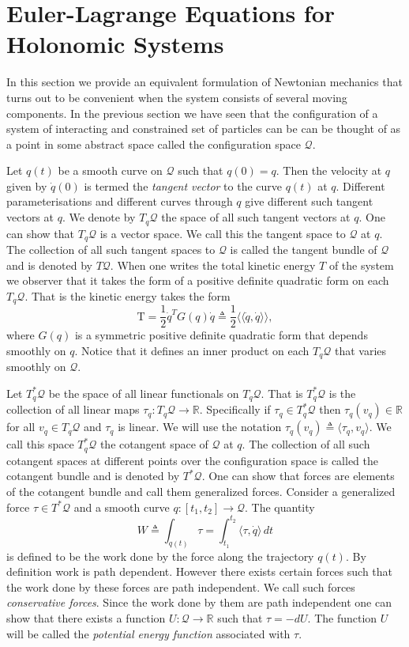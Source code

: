 \documentclass[graybox,envcountchap,sectrefs]{svmonoMuga}
\begin{document}
\section{Euler-Lagrange Equations for Holonomic Systems}

In this section we provide an equivalent formulation of Newtonian mechanics that turns out to be convenient when the system consists of several moving components. In the previous section we have seen that the configuration of a system of interacting and constrained set of particles can be can be thought of as a point in some abstract space called the configuration space $\mathcal{Q}$. 

Let $q(t)$ be a smooth curve on $\mathcal{Q}$ such that $q(0)=q$. Then the velocity at $q$ given by $\dot{q}(0)$ is termed the \textit{tangent vector} to the curve $q(t)$ at $q$. Different parameterisations and different curves through $q$ give different such tangent vectors at $q$. We denote by $T_{q} \mathcal{Q}$ the space of all such tangent vectors at $q$. One can show that $T_{q} \mathcal{Q}$ is a vector space. We call this the tangent space to $\mathcal{Q}$ at $q$. The collection of all such tangent spaces to $\mathcal{Q}$ is called the tangent bundle of $\mathcal{Q}$ and is denoted by $T\mathcal{Q}$. When one writes the total kinetic energy $T$ of the system we observer that it takes the form of a positive definite quadratic form on each $T_{q} \mathcal{Q}$. That is the kinetic energy takes the form
\[
\mathrm{T}=\frac{1}{2}\dot{q}^TG(q)\dot{q}\triangleq \frac{1}{2} \langle\langle \dot{q},\dot{q}\rangle\rangle,
\]
where $G(q)$ is a symmetric positive definite quadratic form that depends smoothly on $q$. Notice that it defines an inner product on each $T_q\mathcal{Q}$ that varies smoothly on $\mathcal{Q}$.

Let $T^*_q\mathcal{Q}$ be the space of all linear functionals on $T_q\mathcal{Q}$. That is $T^*_q\mathcal{Q}$ is the collection of all linear maps $\tau_q : T_q\mathcal{Q} \to \mathbb{R}$. Specifically if $\tau_q\in T^*_q\mathcal{Q}$ then
$\tau_q(v_q)\in \mathbb{R}$ for all $v_q\in T_q\mathcal{Q}$ and $\tau_q$ is linear. We will use the notation $\tau_q(v_q)\triangleq \langle \tau_q,v_q\rangle$.
We call this space $T^*_q\mathcal{Q}$ the cotangent space of $\mathcal{Q}$ at $q$. The collection of all such cotangent spaces at different points over the configuration space is called the cotangent bundle and is denoted by $T^*\mathcal{Q}$. One can show that forces are elements of the cotangent bundle and call them generalized forces. Consider a generalized force $\tau \in  T^*\mathcal{Q}$ and a smooth curve $q : [t_1,t_2] \to \mathcal{Q}$. The quantity 
\[
W\triangleq \int_{q(t)}  \tau=\int_{t_1}^{t_2} \langle \tau,\dot{q}\rangle\,dt
\]
is defined to be the work done by the force along the trajectory $q(t)$. By definition work is path dependent. However there exists certain forces such that the work done by these forces are path independent. We call such forces \textit{conservative forces}. Since the work done by them are path independent one can show that there exists a function $U:\mathcal{Q}\to \mathbb{R}$ such that $\tau=-dU$. The function $U$ will be called the \textit{potential energy function} associated with $\tau$. 
\end{document}
